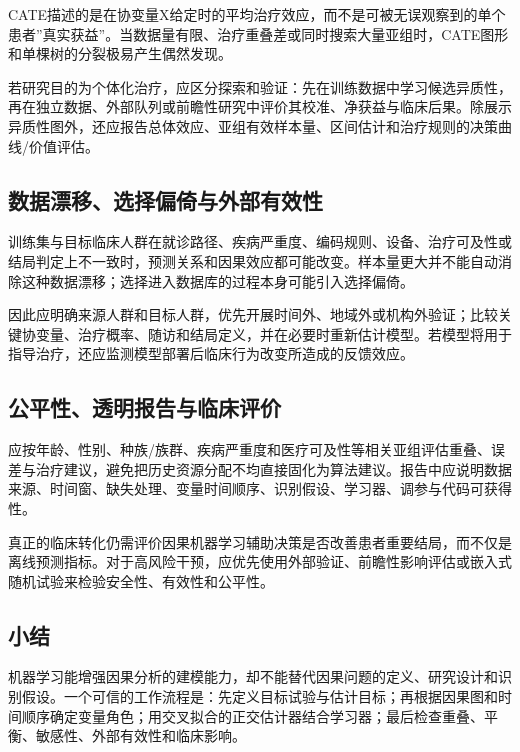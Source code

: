 \documentclass[
  chinese-hans,
  letterpaper,
  DIV=11,
  numbers=noendperiod]{scrreprt}
\begin{document}
CATE描述的是在协变量X给定时的平均治疗效应，而不是可被无误观察到的单个患者''真实获益''。当数据量有限、治疗重叠差或同时搜索大量亚组时，CATE图形和单棵树的分裂极易产生偶然发现。

若研究目的为个体化治疗，应区分探索和验证：先在训练数据中学习候选异质性，再在独立数据、外部队列或前瞻性研究中评价其校准、净获益与临床后果。除展示异质性图外，还应报告总体效应、亚组有效样本量、区间估计和治疗规则的决策曲线/价值评估。

\subsection{数据漂移、选择偏倚与外部有效性}\label{ux6570ux636eux6f02ux79fbux9009ux62e9ux504fux501aux4e0eux5916ux90e8ux6709ux6548ux6027}

训练集与目标临床人群在就诊路径、疾病严重度、编码规则、设备、治疗可及性或结局判定上不一致时，预测关系和因果效应都可能改变。样本量更大并不能自动消除这种数据漂移；选择进入数据库的过程本身可能引入选择偏倚。

因此应明确来源人群和目标人群，优先开展时间外、地域外或机构外验证；比较关键协变量、治疗概率、随访和结局定义，并在必要时重新估计模型。若模型将用于指导治疗，还应监测模型部署后临床行为改变所造成的反馈效应。

\subsection{公平性、透明报告与临床评价}\label{ux516cux5e73ux6027ux900fux660eux62a5ux544aux4e0eux4e34ux5e8aux8bc4ux4ef7}

应按年龄、性别、种族/族群、疾病严重度和医疗可及性等相关亚组评估重叠、误差与治疗建议，避免把历史资源分配不均直接固化为算法建议。报告中应说明数据来源、时间窗、缺失处理、变量时间顺序、识别假设、学习器、调参与代码可获得性。

真正的临床转化仍需评价因果机器学习辅助决策是否改善患者重要结局，而不仅是离线预测指标。对于高风险干预，应优先使用外部验证、前瞻性影响评估或嵌入式随机试验来检验安全性、有效性和公平性。

\subsection{小结}\label{ux5c0fux7ed3}

机器学习能增强因果分析的建模能力，却不能替代因果问题的定义、研究设计和识别假设。一个可信的工作流程是：先定义目标试验与估计目标；再根据因果图和时间顺序确定变量角色；用交叉拟合的正交估计器结合学习器；最后检查重叠、平衡、敏感性、外部有效性和临床影响。
\end{document}
